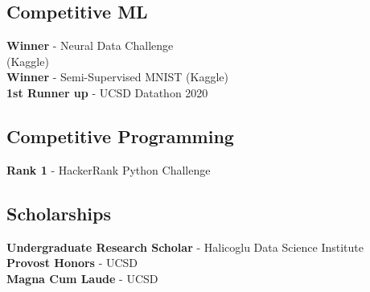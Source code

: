 \documentclass[]{deedy-resume-openfont}
\begin{document}
\begin{minipage}[t]{0.33\textwidth}
\subsection{Competitive ML}
\textbf{Winner} - Neural Data Challenge\\ (Kaggle)\\
\textbf{Winner} - Semi-Supervised MNIST (Kaggle)\\
\textbf{1st Runner up} - UCSD Datathon 2020\\

\sectionsep
\subsection{Competitive Programming}
\textbf{Rank 1} - HackerRank Python Challenge

\sectionsep
\subsection{Scholarships}
\textbf{Undergraduate Research Scholar} - Halicoglu Data Science Institute\\
\textbf{Provost Honors} - UCSD\\
\textbf{Magna Cum Laude} - UCSD

%
%

\end{minipage}
\hfill
\end{document}
